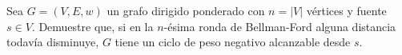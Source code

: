 
Sea $G = (V, E, w)$ un grafo dirigido ponderado con $n = |V|$ vértices y fuente $s \in V$. Demuestre que, si en la $n$-ésima ronda de Bellman-Ford alguna distancia todavía disminuye, $G$ tiene un ciclo de peso negativo alcanzable desde $s$.

